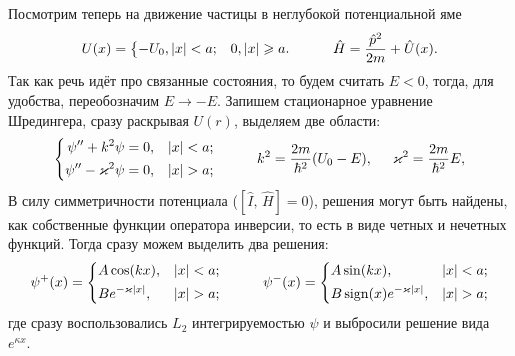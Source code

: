 Посмотрим теперь на движение частицы в неглубокой потенциальной яме 
\begin{equation*}
    U(x) = \left\{\begin{aligned}
        - &U_0, |x| < a;
        &0, |x| \geq a.
    \end{aligned}\right.
    \hspace{10 mm} 
    \hat{H} = \frac{\hat{p}^2}{2m} + \hat{U}(x).
\end{equation*}
Так как речь идёт про связанные состояния, то будем считать $E<0$, тогда, для удобства, переобозначим $E \to -E$.
Запишем стационарное уравнение Шредингера, сразу раскрывая $U(r)$, выделяем две области:
\begin{equation*}
    \left\{\begin{aligned}
        \psi'' + k^2 \psi &= 0,  &|x| < a; \\
        \psi'' - \kappa^2 \psi &= 0, &|x| > a;
    \end{aligned}\right.
    \hspace{10 mm} 
    k^2 = \frac{2m}{\hbar^2} (U_0 - E),
    \hspace{5 mm} 
    \kappa^2 = \frac{2m}{\hbar^2} E,
\end{equation*}
В силу симметричности потенциала ($[\hat{I},\, \hat{H}] = 0$), решения могут быть найдены, как собственные функции оператора инверсии, то есть в виде четных и нечетных функций. Тогда сразу можем выделить два решения:
\begin{equation*}
    \psi^+(x) = \left\{\begin{aligned}
         & A \cos(k x), &|x| < a; \\
         & B e^{- \kappa |x|}, &|x|>a;
    \end{aligned}\right.
    \hspace{10 mm}
    \psi^- (x) = 
    \left\{\begin{aligned}
         & A \sin(k x), & |x| < a; \\
        & B \sign(x) e^{- \kappa |x|}, & |x| > a;
    \end{aligned}\right.
\end{equation*}
где сразу воспользовались $L_2$ интегрируемостью $\psi$ и выбросили решение вида $e^{\kappa x}$.




